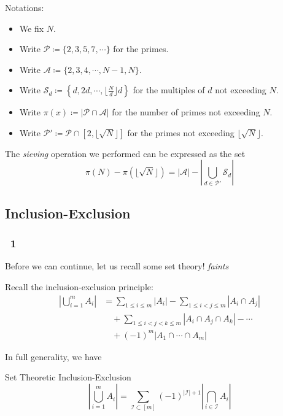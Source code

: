 \begin{frame}\frametitle{\insertsubsection}
Notations:
\begin{itemize}
  \item We fix \(N\).
  \item Write \(\mathcal{P} \coloneqq \{2, 3, 5, 7, \cdots\}\) for the primes.
  \item Write \(\mathcal{A} \coloneqq \{2, 3, 4, \cdots, N - 1, N\}\).
  \item Write \(\mathcal{S}_d \coloneqq \left\{d, 2d, \cdots, \lfloor\frac{N}{d}\rfloor d\right\}\) for the multiples of \(d\) not exceeding \(N\).
  \item Write \(\pi(x) \coloneqq \left|\mathcal{P} \cap \mathcal{A}\right|\) for the number of primes not exceeding \(N\).
  \item Write {\color{blue} \(\mathcal{P}' \coloneqq \mathcal{P} \cap [2, \lfloor\sqrt{N}\rfloor]\)} for the primes not exceeding \(\lfloor\sqrt{N}\rfloor\).
\end{itemize}

The \textit{sieving} operation we performed can be expressed as the set
\[
  \pi(N) - \pi(\lfloor\sqrt{N}\rfloor) = |\mathcal{A}| - \left|\bigcup_{d \in \mathcal{P}'} \mathcal{S}_d\right|
\]
\end{frame}


\subsection{Inclusion-Exclusion}
\begin{frame}\frametitle{\insertsubsection \, 1}
Before we can continue, let us recall some set theory! \textit{faints}
\pause

Recall the inclusion-exclusion principle:
\begin{align*}
  \left|\bigcup_{i = 1}^m A_i\right|
  &= \sum_{1 \leq i \leq m} |A_i| - \sum_{1 \leq i < j \leq m} |A_i \cap A_j| \\
  &\quad+ \sum_{1 \leq i < j < k \leq m} |A_i \cap A_j \cap A_k| - \cdots \\
  &\quad+ (-1)^m |A_1 \cap \cdots \cap A_m|
\end{align*}
\pause

In full generality, we have
\begin{block}{Set Theoretic Inclusion-Exclusion}
\[
  \left|\bigcup_{i = 1}^m A_i\right| = \sum_{\mathcal{I} \subset [m]} (-1)^{|\mathcal{I}| + 1} \left|\bigcap_{i \in \mathcal{I}} A_i\right|
\]
\end{block}
\end{frame}

